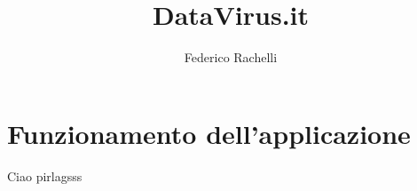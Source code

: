 \documentclass{article}
\begin{document}
    \author{Federico Rachelli}
    \title{DataVirus.it}
    \maketitle

    \section{Funzionamento dell'applicazione}
    Ciao pirlagsss
\end{document}

